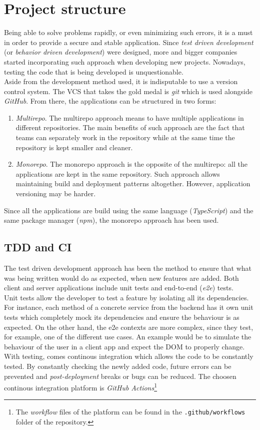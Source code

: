 \documentclass[a4paper, 12pt, oneside]{book}
\begin{document}
\section{Project structure}
Being able to solve problems rapidly, or even minimizing such errors, it is a must in order to provide a secure and stable application. Since \emph{test driven development} (or \emph{behavior driven development}) were designed, more and bigger companies started incorporating such approach when developing new projects. Nowadays, testing the code that is being developed is unquestionable.
\\[8pt]
Aside from the development method used, it is indisputable to use a version control system. The VCS that takes the gold medal is \emph{git} which is used alongside \emph{GitHub}. From there, the applications can be structured in two forms:
\begin{enumerate}[label = -]
	\item \emph{Multirepo}. The multirepo approach means to have multiple applications in different repositories. The main benefits of such approach are the fact that teams can separately work in the repository while at the same time the repository is kept smaller and cleaner.
	\item \emph{Monorepo}. The monorepo approach is the opposite of the multirepo: all the applications are kept in the same repository. Such approach allows maintaining build and deployment patterns altogether. However, application versioning may be harder.
\end{enumerate}
Since all the applications are build using the same language (\emph{TypeScript}) and the same package manager (\emph{npm}), the monorepo approach has been used.
\subsection{TDD and CI}
The test driven development approach has been the method to ensure that what was being written would do as expected, when new features are added. Both client and server applications include unit tests and end-to-end (\emph{e2e}) tests.
\\[8pt]
Unit tests allow the developer to test a feature by isolating all its dependencies. For instance, each method of a concrete service from the backend has it own unit tests which completely mock its dependencies and ensure the behaviour is as expected. On the other hand, the e2e contexts are more complex, since they test, for example, one of the different use cases. An example would be to simulate the behaviour of the user in a client app and expect the DOM to properly change.
\\[8pt]
With testing, comes continous integration which allows the code to be constantly tested. By constantly checking the newly added code, future errors can be prevented and \emph{post-deployment} breaks or bugs can be reduced. The choosen continous integration platform is \emph{GitHub Actions}\footnote{The \emph{workflow} files of the platform can be found in the \texttt{.github/workflows} folder of the repository.}
\end{document}
